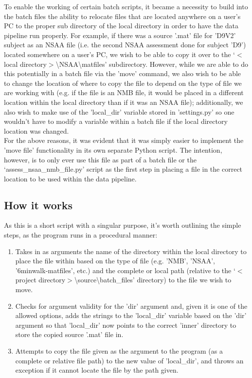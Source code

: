 \documentclass[12pt,twoside]{report}
\begin{document}
\quad To enable the working of certain batch scripts, it became a necessity to build into the batch files the ability to relocate files that are located anywhere on a user's PC to the proper sub directory of the local directory in order to have the data pipeline run properly. For example, if there was a source '.mat' file for 'D9V2' subject as an NSAA file (i.e. the second NSAA assessment done for subject 'D9') located somewhere on a user's PC, we wish to be able to copy it over to the $‘<$local directory$>$\textbackslash NSAA\textbackslash matfiles’ subdirectory. However, while we are able to do this potentially in a batch file via the 'move' command, we also wish to be able to change the location of where to copy the file to depend on the type of file we are working with (e.g. if the file is an NMB file, it would be placed in a different location within the local directory than if it was an NSAA file); additionally, we also wish to make use of the 'local\_dir' variable stored in 'settings.py' so one wouldn't have to modify a variable within a batch file if the local directory location was changed.\\

\quad For the above reasons, it was evident that it was simply easier to implement the 'move file' functionality in its own separate Python script. The intention, however, is to only ever use this file as part of a batch file or the ‘assess\_nsaa\_nmb\_file.py’ script as the first step in placing a file in the correct location to be used within the data pipeline.

\subsection{How it works}

\quad As this is a short script with a singular purpose, it's worth outlining the simple steps, as the program runs in a procedural manner:

\begin{enumerate}
	\item Takes in as arguments the name of the directory within the local directory to place the file within based on the type of file (e.g. 'NMB', 'NSAA', '6minwalk-matfiles', etc.) and the complete or local path (relative to the ‘$<$project directory$>$\textbackslash source\textbackslash batch\_files’ directory) to the file we wish to move.
	\item Checks for argument validity for the 'dir' argument and, given it is one of the allowed options, adds the strings to the 'local\_dir' variable based on the 'dir' argument so that 'local\_dir' now points to the correct 'inner' directory to store the copied source '.mat' file in.
	\item Attempts to copy the file given as the argument to the program (as a complete or relative file path) to the new value of 'local\_dir', and throws an exception if it cannot locate the file by the path given.
\end{enumerate}
\end{document}

